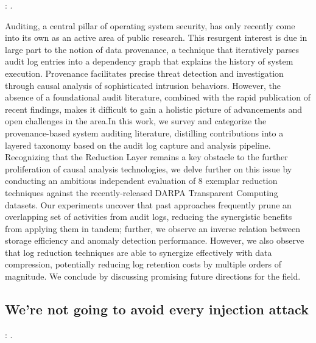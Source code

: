 \documentclass{article}
\begin{document}
\textbf{}: \textcite{Inam:2023}.

Auditing, a central pillar of operating system security, has only recently come into its own as an active area of public research. This resurgent interest is due in large part to the notion of data provenance, a technique that iteratively parses audit log entries into a dependency graph that explains the history of system execution. Provenance facilitates precise threat detection and investigation through causal analysis of sophisticated intrusion behaviors. However, the absence of a foundational audit literature, combined with the rapid publication of recent findings, makes it difficult to gain a holistic picture of advancements and open challenges in the area.In this work, we survey and categorize the provenance-based system auditing literature, distilling contributions into a layered taxonomy based on the audit log capture and analysis pipeline. Recognizing that the Reduction Layer remains a key obstacle to the further proliferation of causal analysis technologies, we delve further on this issue by conducting an ambitious independent evaluation of 8 exemplar reduction techniques against the recently-released DARPA Transparent Computing datasets. Our experiments uncover that past approaches frequently prune an overlapping set of activities from audit logs, reducing the synergistic benefits from applying them in tandem; further, we observe an inverse relation between storage efficiency and anomaly detection performance. However, we also observe that log reduction techniques are able to synergize effectively with data compression, potentially reducing log retention costs by multiple orders of magnitude. We conclude by discussing promising future directions for the field.

\subsection{We're not going to avoid every injection attack}

\textbf{}: \textcite{Zengy:2022}.
\end{document}
